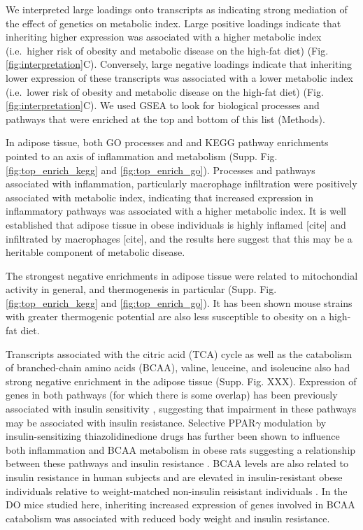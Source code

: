 \documentclass[
]{article}
\begin{document}
We interpreted large loadings onto transcripts as indicating strong
mediation of the effect of genetics on metabolic index. Large positive
loadings indicate that inheriting higher expression was associated with
a higher metabolic index (i.e.~higher risk of obesity and metabolic
disease on the high-fat diet) (Fig. \ref{fig:interpretation}C).
Conversely, large negative loadings indicate that inheriting lower
expression of these transcripts was associated with a lower metabolic
index (i.e.~lower risk of obesity and metabolic disease on the high-fat
diet) (Fig. \ref{fig:interpretation}C). We used GSEA to look for
biological processes and pathways that were enriched at the top and
bottom of this list (Methods).

In adipose tissue, both GO processes and and KEGG pathway enrichments
pointed to an axis of inflammation and metabolism (Supp. Fig.
\ref{fig:top_enrich_kegg} and \ref{fig:top_enrich_go}). Processes and
pathways associated with inflammation, particularly macrophage
infiltration were positively associated with metabolic index, indicating
that increased expression in inflammatory pathways was associated with a
higher metabolic index. It is well established that adipose tissue in
obese individuals is highly inflamed {[}cite{]} and infiltrated by
macrophages {[}cite{]}, and the results here suggest that this may be a
heritable component of metabolic disease.

The strongest negative enrichments in adipose tissue were related to
mitochondial activity in general, and thermogenesis in particular (Supp.
Fig. \ref{fig:top_enrich_kegg} and \ref{fig:top_enrich_go}). It has been
shown mouse strains with greater thermogenic potential are also less
susceptible to obesity on a high-fat diet.

Transcripts associated with the citric acid (TCA) cycle as well as the
catabolism of branched-chain amino acids (BCAA), valine, leuceine, and
isoleucine also had strong negative enrichment in the adipose tissue
(Supp. Fig. XXX). Expression of genes in both pathways (for which there
is some overlap) has been previously associated with insulin sensitivity
\cite{pmid29567659,pmid22560213,pmid19841271}, suggesting that
impairment in these pathways may be associated with insulin resistance.
Selective PPAR\(\gamma\) modulation by insulin-sensitizing
thiazolidinedione drugs has further been shown to influence both
inflammation and BCAA metabolism in obese rats suggesting a relationship
between these pathways and insulin resistance \cite{pmid20959535}. BCAA
levels are also related to insulin resistance in human subjects and are
elevated in insulin-resistant obese individuals relative to
weight-matched non-insulin reisistant individuals \cite{pmid23512805}.
In the DO mice studied here, inheriting increased expression of genes
involved in BCAA catabolism was associated with reduced body weight and
insulin resistance.
\end{document}
